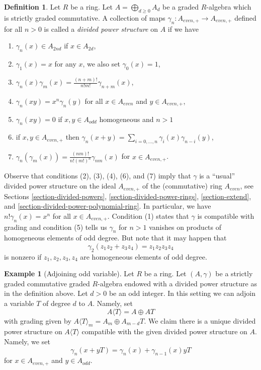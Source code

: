 \documentclass{stacks-project}
\theoremstyle{plain}
\theoremstyle{definition}
\newtheorem{definition}[subsection]{Definition}
\newtheorem{example}[subsection]{Example}
\theoremstyle{remark}
\numberwithin{equation}{subsection}
\begin{document}
\begin{definition}
\label{definition-divided-powers-graded}
Let $R$ be a ring. Let $A = \bigoplus_{d \geq 0} A_d$ be a graded
$R$-algebra which is strictly graded commutative. A collection of maps
$\gamma_n : A_{even, +} \to A_{even, +}$ defined for all $n > 0$ is called
a {\it divided power structure} on $A$ if we have
\begin{enumerate}
\item $\gamma_n(x) \in A_{2nd}$ if $x \in A_{2d}$,
\item $\gamma_1(x) = x$ for any $x$, we also set $\gamma_0(x) = 1$,
\item $\gamma_n(x)\gamma_m(x) = \frac{(n + m)!}{n! m!} \gamma_{n + m}(x)$,
\item $\gamma_n(xy) = x^n \gamma_n(y)$ for all $x \in A_{even}$ and
$y \in A_{even, +}$,
\item $\gamma_n(xy) = 0$ if $x, y \in A_{odd}$ homogeneous and $n > 1$
\item if $x, y \in A_{even, +}$ then
$\gamma_n(x + y) = \sum_{i = 0, \ldots, n} \gamma_i(x)\gamma_{n - i}(y)$,
\item $\gamma_n(\gamma_m(x)) =
\frac{(nm)!}{n! (m!)^n} \gamma_{nm}(x)$ for $x \in A_{even, +}$.
\end{enumerate}
\end{definition}

\noindent
Observe that conditions (2), (3), (4), (6), and (7) imply that
$\gamma$ is a ``usual'' divided power structure on the ideal
$A_{even, +}$ of the (commutative) ring $A_{even}$, see
Sections \ref{section-divided-powers},
\ref{section-divided-power-rings},
\ref{section-extend}, and
\ref{section-divided-power-polynomial-ring}.
In particular, we have $n! \gamma_n(x) = x^n$ for all $x \in A_{even, +}$.
Condition (1) states that $\gamma$ is compatible with grading and condition
(5) tells us $\gamma_n$ for $n > 1$ vanishes on products
of homogeneous elements of odd degree. But note that it may happen
that
$$
\gamma_2(z_1 z_2 + z_3 z_4) = z_1z_2z_3z_4
$$
is nonzero if $z_1, z_2, z_3, z_4$ are homogeneous elements of odd degree.

\begin{example}[Adjoining odd variable]
\label{example-adjoining-odd}
Let $R$ be a ring. Let $(A, \gamma)$ be a strictly graded commutative
graded $R$-algebra endowed with a divided power structure as in the
definition above. Let $d > 0$ be an odd integer.
In this setting we can adjoin a variable $T$ of degree $d$ to $A$.
Namely, set
$$
A\langle T \rangle = A \oplus AT
$$
with grading given by $A\langle T \rangle_m = A_m \oplus A_{m - d}T$.
We claim there is a unique divided power structure on
$A\langle T \rangle$ compatible with the given divided power
structure on $A$. Namely, we set
$$
\gamma_n(x + yT) = \gamma_n(x) + \gamma_{n - 1}(x)yT
$$
for $x \in A_{even, +}$ and $y \in A_{odd}$.
\end{example}
\end{document}
